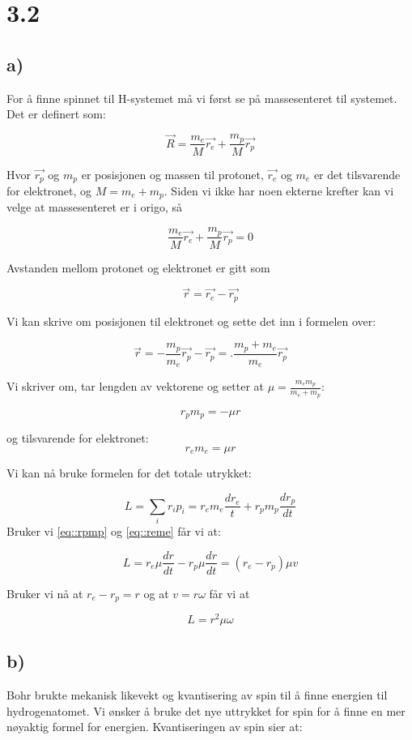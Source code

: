 \documentclass[a4paper,norsk, 10pt]{article}
\begin{document}
\section*{3.2}
\subsection*{a)}
For å finne spinnet til H-systemet må vi først se på massesenteret til systemet. Det er definert som:

$$
\vec{R} = \frac{m_e}{M}\vec{r_e} + \frac{m_p}{M}\vec{r_p}
$$

Hvor $\vec{r_p}$ og $m_p$ er posisjonen og massen til protonet, $\vec{r_e}$ og $m_e$ er det tilsvarende for elektronet, og $M = m_e + m_p$. Siden vi ikke har noen ekterne krefter kan vi velge at massesenteret er i origo, så

$$
 \frac{m_e}{M}\vec{r_e} + \frac{m_p}{M}\vec{r_p} = 0
$$

Avstanden mellom protonet og elektronet er gitt som

$$
\vec{r} = \vec{r_e} - \vec{r_p}
$$

Vi kan skrive om posisjonen til elektronet og sette det inn i formelen over:

$$
\vec{r} = -\frac{m_p}{m_e}\vec{r_p} - \vec{r_p} = .\frac{m_p + m_e}{m_e}\vec{r_p}
$$ 

Vi skriver om, tar lengden av vektorene og setter at $\mu = \frac{m_em_p}{m_e+m_p}$:

\begin{equation}
r_pm_p = -\mu r
\end{equation}\label{eq::rpmp}

og tilsvarende for elektronet:
\begin{equation}
r_em_e = \mu r
\end{equation}\label{eq::reme}

Vi kan nå bruke formelen for det totale utrykket:

$$
L = \sum_i r_ip_i = r_em_e\frac{dr_e}{t} + r_pm_p\frac{dr_p}{dt}
$$
Bruker vi \ref{eq::rpmp} og \ref{eq::reme} får vi at:

$$
L = r_e\mu \frac{dr}{dt} - r_p \mu \frac{dr}{dt} = (r_e -  r_p)\mu v
$$

Bruker vi nå at $r_e - r_p = r$ og at $v = r\omega$ får vi at

$$
L = r^2 \mu \omega
$$

\subsection*{b)}
Bohr brukte mekanisk likevekt og kvantisering av spin til å finne energien til hydrogenatomet. Vi ønsker å bruke det nye uttrykket for spin for å finne en mer nøyaktig formel for energien. Kvantiseringen av spin sier at:
\end{document}
